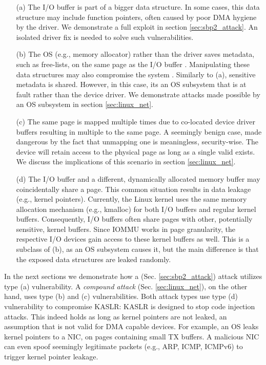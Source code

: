 \begin{enumerate}
    \item[(a)] The I/O buffer is part of a bigger data structure. In some cases, this data structure may include function pointers, often caused by poor DMA hygiene by the driver. We demonstrate a full exploit in section \ref{sec:sbp2_attack}. An isolated driver fix is needed to solve such vulnerabilities.
    \item[(b)] The OS (e.g., memory allocator) rather than the driver saves metadata, such as free-lists, on the same page as the I/O buffer \cite{Cor07}. Manipulating these data structures may also compromise the system \cite{ak09}. Similarly to (a), sensitive metadata is shared. However, in this case, its an OS subsystem that is at fault rather than the device driver. We demonstrate attacks made possible by an OS subsystem in section \ref{sec:linux_net}.
    \item[(c)] The same page is mapped multiple times due to co-located device driver buffers resulting in multiple \iova{} to the same page. A seemingly benign case, made dangerous by the fact that unmapping one \iova{} is meaningless, security-wise. The device will retain access to the physical page as long as a single valid \iova{} exists. We discuss the implications of this scenario in section \ref{sec:linux_net}.
    \item[(d)] The I/O buffer and a different, dynamically allocated memory buffer may coincidentally share a page. This common situation results in data leakage (e.g., kernel pointers). Currently, the Linux kernel uses the same memory allocation mechanism (e.g., kmalloc) for both I/O buffers and regular kernel buffers. Consequently, I/O buffers often share pages with other, potentially sensitive, kernel buffers. Since IOMMU works in page granularity, the respective I/O devices gain access to these kernel buffers as well. This is a subclass of (b), as an OS subsystem causes it, but the main difference is that the exposed data structures are leaked randomly.

\end{enumerate}

In the next sections we demonstrate how a \simple{} (Sec. \ref{sec:sbp2_attack}) attack utilizes type (a) vulnerability. A \emph{compound attack} (Sec. \ref{sec:linux_net}), on the other hand, uses type (b) and (c) vulnerabilities. Both attack types use type (d) vulnerability to compromise KASLR: KASLR is designed to stop code injection attacks. This indeed holds as long as kernel pointers are not leaked, an assumption that is not valid for DMA capable devices. For example, an OS leaks kernel pointers to a NIC, on pages containing small TX buffers. A malicious NIC can even spoof seemingly legitimate packets (e.g., ARP, ICMP, ICMPv6) to trigger kernel pointer leakage.

